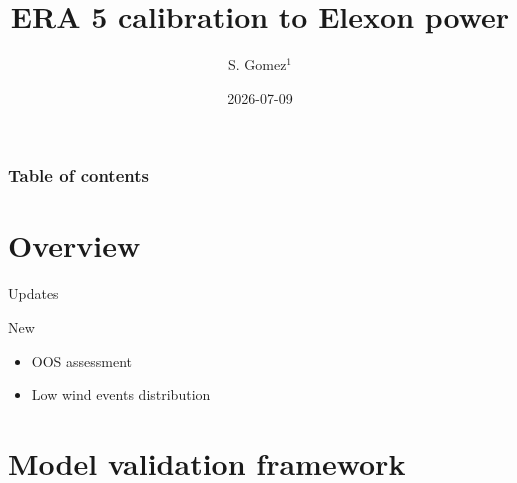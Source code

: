 \documentclass[
  12pt,
  ignorenonframetext,
  aspectratio=169,
]{beamer}
\title{ERA 5 calibration to Elexon power}
\author{S. Gomez\(^1\)}
\date{2026-07-09}
\institute{\(^1\)School of Mathematics, University of Edinburgh}
\renewcommand*\contentsname{Table of contents}
\newcommand\contentsname{Table of contents}
\begin{document}
\frame{\titlepage}
\ifdefined\Shaded\renewenvironment{Shaded}{\begin{tcolorbox}[breakable, enhanced, frame hidden, borderline west={3pt}{0pt}{shadecolor}, boxrule=0pt, interior hidden, sharp corners]}{\end{tcolorbox}}\fi

\renewcommand*\contentsname{Table of contents}
\begin{frame}[allowframebreaks]
  \frametitle{Table of contents}
  \tableofcontents[hideallsubsections]
\end{frame}
\hypertarget{sec-intro}{%
\section{Overview}\label{sec-intro}}

\begin{frame}{Updates}
\protect\hypertarget{sec-updates}{}
\begin{block}{New}
\protect\hypertarget{new}{}
\begin{itemize}
  \item OOS assessment
  \item Low wind events distribution
\end{itemize}
\end{block}
\end{frame}

\hypertarget{model-validation-framework}{%
\section{Model validation framework}\label{model-validation-framework}}
\end{document}

